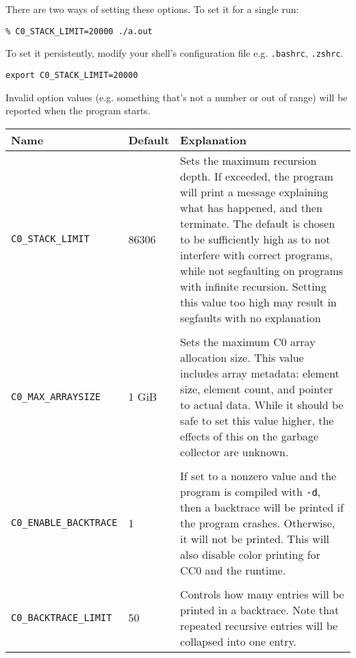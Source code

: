 \documentclass[11pt]{article}
\begin{document}
There are two ways of setting these options. To set it for a single run:
\begin{lstlisting}
% C0_STACK_LIMIT=20000 ./a.out
\end{lstlisting}
To set it persistently, modify your shell's configuration file e.g. \texttt{.bashrc}, \texttt{.zshrc}.
\begin{lstlisting}
export C0_STACK_LIMIT=20000
\end{lstlisting}
Invalid option values (e.g. something that's not a number or out of range) will be reported when the program starts.

\begin{center}
\begin{longtable}{llp{7cm}}
  Name & Default & Explanation \\
  \hline
  \rule{0pt}{\normalbaselineskip}
  \texttt{C0\_STACK\_LIMIT} & 86306 & Sets the maximum recursion depth. If exceeded, the program will print a message explaining what has happened, and then terminate. The default is chosen to be sufficiently high as to not interfere with correct programs, while not segfaulting on programs with infinite recursion. Setting this value too high may result in segfaults with no explanation \\
  \\
  \texttt{C0\_MAX\_ARRAYSIZE} & 1 GiB & Sets the maximum C0 array allocation size. This value includes array metadata: element size, element count, and pointer to actual data. While it should be safe to set this value higher, the effects of this on the garbage collector are unknown. \\
  \\
  \texttt{C0\_ENABLE\_BACKTRACE} & 1 & If set to a nonzero value and the program is compiled with \texttt{-d}, then a backtrace will be printed if the program crashes. Otherwise, it will not be printed. This will also disable color printing for CC0 and the runtime. \\
  \\
  \texttt{C0\_BACKTRACE\_LIMIT} & 50 & Controls how many entries will be printed in a backtrace. Note that repeated recursive entries will be collapsed into one entry.
\end{longtable}
\end{center}
\end{document}
